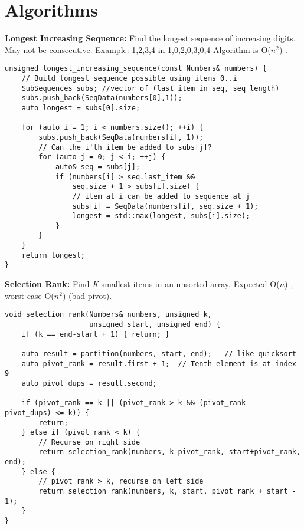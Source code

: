 \documentclass[12pt]{article}
\newcommand{\ON}{O($n$) }
\newcommand{\ONSQ}{O($n^2$) }
\begin{document}
\newpage
\section{Algorithms}
\noindent
\textbf{Longest Increasing Sequence:}
Find the longest sequence of increasing digits. May not be consecutive.
Example: {1,2,3,4} in {1,0,2,0,3,0,4}
Algorithm is \ONSQ.

\begin{lstlisting}[frame=single]
unsigned longest_increasing_sequence(const Numbers& numbers) {
    // Build longest sequence possible using items 0..i
    SubSequences subs; //vector of (last item in seq, seq length)
    subs.push_back(SeqData(numbers[0],1));
    auto longest = subs[0].size;

    for (auto i = 1; i < numbers.size(); ++i) {
        subs.push_back(SeqData(numbers[i], 1));
        // Can the i'th item be added to subs[j]?
        for (auto j = 0; j < i; ++j) {
            auto& seq = subs[j];
            if (numbers[i] > seq.last_item && 
                seq.size + 1 > subs[i].size) {
                // item at i can be added to sequence at j
                subs[i] = SeqData(numbers[i], seq.size + 1);
                longest = std::max(longest, subs[i].size); 
            } 
        }
    }
    return longest;
}
\end{lstlisting}

\vspace{5mm}
\noindent
\textbf{Selection Rank:}
Find \emph{K} smallest items in an unsorted array.
Expected \ON, worst case \ONSQ (bad pivot). 

\begin{lstlisting}[frame=single]
void selection_rank(Numbers& numbers, unsigned k, 
                    unsigned start, unsigned end) {
    if (k == end-start + 1) { return; }

    auto result = partition(numbers, start, end);   // like quicksort
    auto pivot_rank = result.first + 1;  // Tenth element is at index 9 
    auto pivot_dups = result.second;

    if (pivot_rank == k || (pivot_rank > k && (pivot_rank - pivot_dups) <= k)) {
        return;
    } else if (pivot_rank < k) {
        // Recurse on right side
        return selection_rank(numbers, k-pivot_rank, start+pivot_rank, end);
    } else {
        // pivot_rank > k, recurse on left side
        return selection_rank(numbers, k, start, pivot_rank + start - 1);
    }
}
\end{lstlisting}
\end{document}
